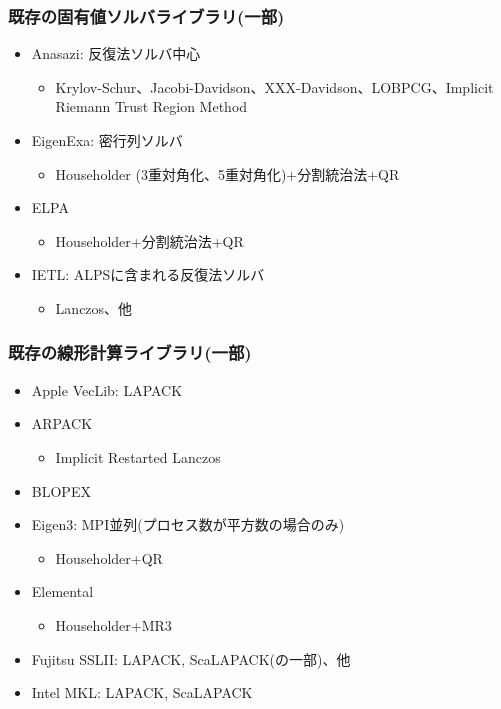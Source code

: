 \begin{frame}
  \frametitle{既存の固有値ソルバライブラリ(一部)}
  \begin{itemize}
  \item Anasazi: 反復法ソルバ中心
    \begin{itemize}
      \item Krylov-Schur、Jacobi-Davidson、XXX-Davidson、LOBPCG、Implicit Riemann Trust Region Method
    \end{itemize}
  \item EigenExa: 密行列ソルバ
    \begin{itemize}
      \item Householder (3重対角化、5重対角化)+分割統治法+QR
    \end{itemize}
  \item ELPA
    \begin{itemize}
      \item Householder+分割統治法+QR
    \end{itemize}
  \item IETL: ALPSに含まれる反復法ソルバ
    \begin{itemize}
      \item Lanczos、他
    \end{itemize}
  \end{itemize}
\end{frame}

\begin{frame}
  \frametitle{既存の線形計算ライブラリ(一部)}
  \begin{itemize}
  \item Apple VecLib: LAPACK
  \item ARPACK
    \begin{itemize}
      \item Implicit Restarted Lanczos
    \end{itemize}
  \item BLOPEX
  \item Eigen3: MPI並列(プロセス数が平方数の場合のみ)
    \begin{itemize}
      \item Householder+QR
    \end{itemize}
  \item Elemental
    \begin{itemize}
      \item Householder+MR3
    \end{itemize}
  \item Fujitsu SSLII: LAPACK, ScaLAPACK(の一部)、他
  \item Intel MKL: LAPACK, ScaLAPACK
  \end{itemize}
\end{frame}

